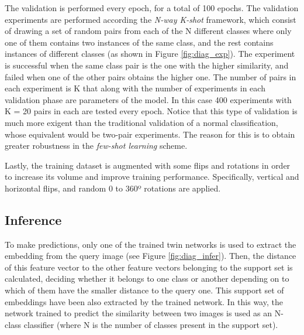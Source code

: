 The validation is performed every epoch, for a total of 100 epochs. The validation experiments are performed according the \emph{N-way K-shot} framework, which consist of drawing a set of random pairs from each of the N different classes where only one of them contains two instances of the same class, and the rest contains instances of different classes (as shown in Figure \ref{fig:diag_exp}). The experiment is successful when the same class pair is the one with the higher similarity, and failed when one of the other pairs obtains the higher one. The number of pairs in each experiment is K that along with the number of experiments in each validation phase are parameters of the model. In this case 400 experiments with K = 20 pairs in each are tested every epoch. Notice that this type of validation is much more exigent than the traditional validation of a normal classification, whose equivalent would be two-pair experiments. The reason for this is to obtain greater robustness in the \emph{few-shot learning} scheme.


Lastly, the training dataset is augmented with some flips and rotations in order to increase its volume and improve training performance. Specifically, vertical and horizontal flips, and random 0 to 360º rotations are applied.


\subsection{Inference}
\label{subsec:inference}
To make predictions, only one of the trained twin networks is used to extract the embedding from the query image (see Figure \ref{fig:diag_infer}). Then, the distance of this feature vector to the other feature vectors belonging to the support set is calculated, deciding whether it belongs to one class or another depending on to which of them have the smaller distance to the query one. This support set of embeddings have been also extracted by the trained network. In this way, the network trained to predict the similarity between two images is used as an N-class classifier (where N is the number of classes present in the support set).

